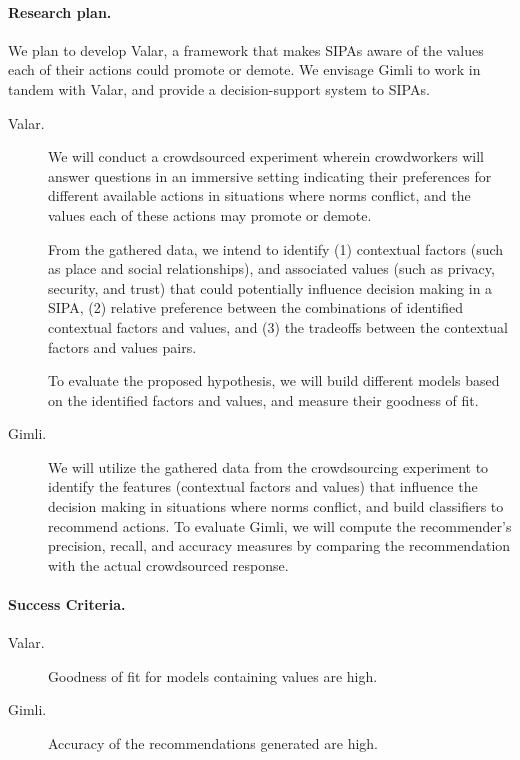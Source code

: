 \documentclass[11pt,          %
               phd,           %
               onehalfspacing %
               ]{ncsuthesis}
\newcommand{\frameworkC}{Valar\xspace}
\newcommand{\frameworkD}{Gimli\xspace}
\newcounter{hypothesis}
\begin{document}
\paragraph*{Research plan.}

We plan to develop \frameworkC, a framework that makes SIPAs aware of
the values each of their actions could promote or demote. We envisage
\frameworkD to work in tandem with \frameworkC, and provide a
decision-support system to SIPAs.

\begin{description}

\item[\frameworkC.] We will conduct a crowdsourced experiment wherein
crowdworkers will answer questions in an immersive setting indicating
their preferences for different available actions in situations where
norms conflict, and the values each of these actions may promote or
demote.

From the gathered data, we intend to identify (1) contextual factors
(such as place and social relationships), and associated values (such as
privacy, security, and trust) that could potentially influence decision
making in a SIPA, (2) relative preference between the combinations of
identified contextual factors and values, and (3) the tradeoffs between
the contextual factors and values pairs.

To evaluate the proposed hypothesis, we will build different models
based on the identified factors and values, and measure their goodness of fit.

\item[\frameworkD.] We will utilize the gathered data from the
crowdsourcing experiment to identify the features (contextual factors
and values) that influence the decision making in situations where norms
conflict, and build classifiers to recommend actions. To evaluate
\frameworkD, we will compute the recommender's precision, recall, and
accuracy measures by comparing the recommendation with the actual
crowdsourced response.

\end{description}


\paragraph*{Success Criteria.}
\begin{description}
\item[\frameworkC.] Goodness of fit for models containing values are high. 
\item[\frameworkD.] Accuracy of the recommendations generated are high. 
\end{description}
\end{document}
